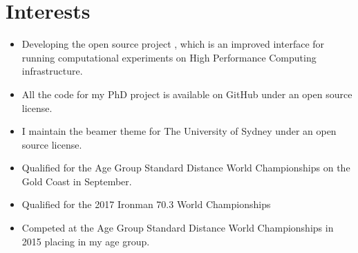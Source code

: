 \section{Interests}

{%
  \begin{itemize}
    \item Developing the open source project ,
      which is an improved interface for running computational experiments on High Performance Computing infrastructure.
    \item All the code for my PhD project is available on GitHub under an open source license.
    \item I maintain the beamer theme for The University of Sydney under an open source license.
  \end{itemize}
}

{%
  \begin{itemize}
    \item Qualified for the Age Group Standard Distance World Championships on the Gold Coast in
      September.
    \item Qualified for the 2017 Ironman 70.3 World Championships
    \item Competed at the Age Group Standard Distance World Championships in 2015 placing  in my age group.
  \end{itemize}
}




